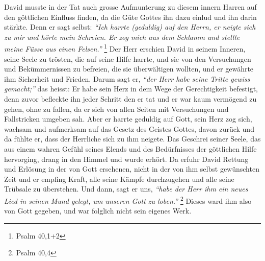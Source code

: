 David  musste in der Tat auch grosse Aufmunterung zu
diesem innern Harren
auf den göttlichen Einfluss finden, da die Güte Gottes ihn dazu einlud und ihn
darin stärkte. Denn er sagt selbst:
\textit{"`Ich harrte (geduldig) auf den Herrn,
er neigte sich zu mir und hörte mein Schreien. Er zog mich aus dem Schlamm und
stellte meine Füsse aus einen Felsen."'}
\footnote{Psalm 40,1+2}
Der Herr
erschien David in seinem Inneren, seine Seele zu trösten, die auf
seine Hilfe
harrte, und sie von den Versuchungen und Bekümmernissen zu befreien, die sie
überwältigen wollten, und er gewährte ihm Sicherheit und Frieden. Darum sagt er,
\textit{"`der Herr habe seine Tritte gewiss gemacht;"'}
das heisst: Er habe sein Herz in
dem Wege der Gerechtigkeit befestigt, denn zuvor befleckte ihn jeder Schritt den
er tat und er war kaum vermögend zu gehen, ohne zu fallen, da er sich von
allen Seiten mit Versuchungen und Fallstricken umgeben sah. Aber er harrte
geduldig auf Gott, sein Herz zog sich, wachsam und aufmerksam auf das Gesetz des
Geistes Gottes, davon zurück und da fühlte er, dass der Herrliche sich zu ihm
neigete. Das Geschrei seiner Seele, das aus einem
wahren Gefühl seines Elends
und des Bedürfnisses der göttlichen Hilfe hervorging, drang in den Himmel und
wurde erhört. Da erfuhr David Rettung und Erlösung in der von Gott ersehenen,
nicht in der von ihm selbst gewünschten Zeit und er empfing Kraft, alle seine
Kämpfe durchzugehen und alle seine Trübsale zu überstehen. Und dann, sagt er
uns,
\textit{"`habe der Herr ihm ein neues Lied in seinen Mund gelegt, um unseren
Gott
zu loben."'}
\footnote{Psalm 40,4}
Dieses ward ihm also von Gott gegeben, und war
folglich nicht sein eigenes Werk.

\medskip

